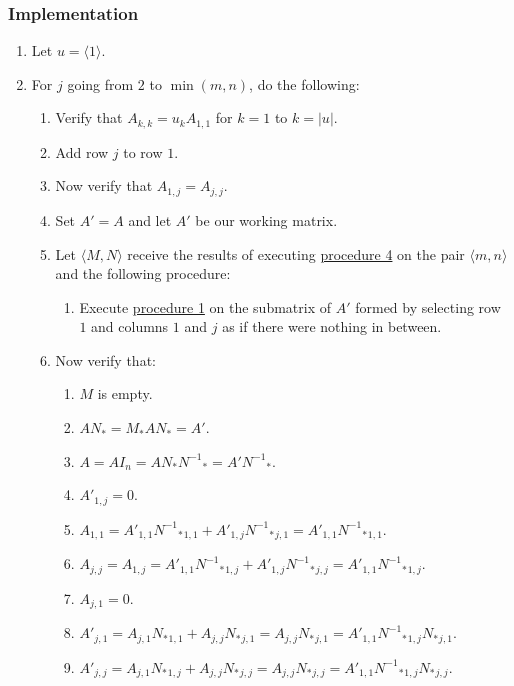 \documentclass[twocolumn]{article}
\begin{document}
			\subsubsection{Implementation}
				\begin{enumerate}
					\item Let $u=\langle 1\rangle$.
					\item For $j$ going from $2$ to $\min(m,n)$, do the following:
					\begin{enumerate}
						\item Verify that $A_{k,k}=u_kA_{1,1}$ for $k=1$ to $k=\lvert u\rvert$.
						\item Add row $j$ to row $1$.
						\item Now verify that $A_{1,j}=A_{j,j}$.
						\item Set $A'=A$ and let $A'$ be our working matrix.
						\item Let $\langle M,N\rangle$ receive the results of executing \hyperref[sec:procedure 4]{procedure 4} on the pair $\langle m,n\rangle$ and the following procedure:
						\begin{enumerate}
							\item Execute \hyperref[sec:procedure 1]{procedure 1} on the submatrix of $A'$ formed by selecting row $1$ and columns $1$ and $j$ as if there were nothing in between.
						\end{enumerate}
						\item Now verify that:
						\begin{enumerate}
							\item $M$ is empty.
							\item $AN_*=M_*AN_*=A'$.
							\item $A=AI_n=AN_*{N^{-1}}_*=A'{N^{-1}}_*$.
							\item $A'_{1,j}=0$.
							\item $A_{1,1}=A'_{1,1}{{N^{-1}}_*}_{1,1}+A'_{1,j}{{N^{-1}}_*}_{j,1}=A'_{1,1}{{N^{-1}}_*}_{1,1}$.
							\item $A_{j,j}=A_{1,j}=A'_{1,1}{{N^{-1}}_*}_{1,j}+A'_{1,j}{{N^{-1}}_*}_{j,j}=A'_{1,1}{{N^{-1}}_*}_{1,j}$.
							\item $A_{j,1}=0$.
							\item $A'_{j,1}=A_{j,1}{N_*}_{1,1}+A_{j,j}{N_*}_{j,1}=A_{j,j}{N_*}_{j,1}=A'_{1,1}{{N^{-1}}_*}_{1,j}{N_*}_{j,1}$.
							\item $A'_{j,j}=A_{j,1}{N_*}_{1,j}+A_{j,j}{N_*}_{j,j}=A_{j,j}{N_*}_{j,j}=A'_{1,1}{{N^{-1}}_*}_{1,j}{N_*}_{j,j}$.
						\end{enumerate}

\end{enumerate}
\end{enumerate}
\end{document}
